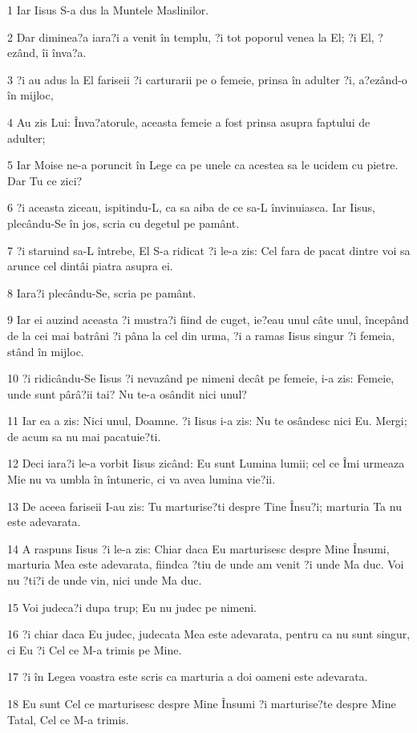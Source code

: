 \par 1 Iar Iisus S-a dus la Muntele Maslinilor.
\par 2 Dar diminea?a iara?i a venit în templu, ?i tot poporul venea la El; ?i El, ?ezând, îi înva?a.
\par 3 ?i au adus la El fariseii ?i carturarii pe o femeie, prinsa în adulter ?i, a?ezând-o în mijloc,
\par 4 Au zis Lui: Înva?atorule, aceasta femeie a fost prinsa asupra faptului de adulter;
\par 5 Iar Moise ne-a poruncit în Lege ca pe unele ca acestea sa le ucidem cu pietre. Dar Tu ce zici?
\par 6 ?i aceasta ziceau, ispitindu-L, ca sa aiba de ce sa-L învinuiasca. Iar Iisus, plecându-Se în jos, scria cu degetul pe pamânt.
\par 7 ?i staruind sa-L întrebe, El S-a ridicat ?i le-a zis: Cel fara de pacat dintre voi sa arunce cel dintâi piatra asupra ei.
\par 8 Iara?i plecându-Se, scria pe pamânt.
\par 9 Iar ei auzind aceasta ?i mustra?i fiind de cuget, ie?eau unul câte unul, începând de la cei mai batrâni ?i pâna la cel din urma, ?i a ramas Iisus singur ?i femeia, stând în mijloc.
\par 10 ?i ridicându-Se Iisus ?i nevazând pe nimeni decât pe femeie, i-a zis: Femeie, unde sunt pârâ?ii tai? Nu te-a osândit nici unul?
\par 11 Iar ea a zis: Nici unul, Doamne. ?i Iisus i-a zis: Nu te osândesc nici Eu. Mergi; de acum sa nu mai pacatuie?ti.
\par 12 Deci iara?i le-a vorbit Iisus zicând: Eu sunt Lumina lumii; cel ce Îmi urmeaza Mie nu va umbla în întuneric, ci va avea lumina vie?ii.
\par 13 De aceea fariseii I-au zis: Tu marturise?ti despre Tine Însu?i; marturia Ta nu este adevarata.
\par 14 A raspuns Iisus ?i le-a zis: Chiar daca Eu marturisesc despre Mine Însumi, marturia Mea este adevarata, fiindca ?tiu de unde am venit ?i unde Ma duc. Voi nu ?ti?i de unde vin, nici unde Ma duc.
\par 15 Voi judeca?i dupa trup; Eu nu judec pe nimeni.
\par 16 ?i chiar daca Eu judec, judecata Mea este adevarata, pentru ca nu sunt singur, ci Eu ?i Cel ce M-a trimis pe Mine.
\par 17 ?i în Legea voastra este scris ca marturia a doi oameni este adevarata.
\par 18 Eu sunt Cel ce marturisesc despre Mine Însumi ?i marturise?te despre Mine Tatal, Cel ce M-a trimis.
